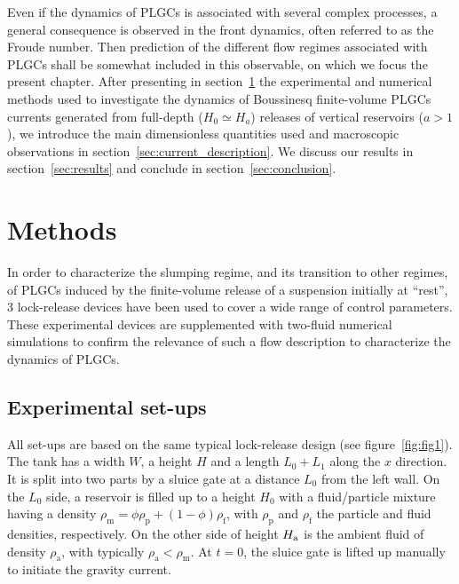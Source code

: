 \documentclass[12pt]{article}
\begin{document}
Even if the dynamics of PLGCs is associated with several complex processes, a general consequence is observed in the front dynamics, often referred to as the Froude number. Then prediction of the different flow regimes associated with PLGCs shall be somewhat included in this observable, on which we focus the present chapter. After presenting in section~\ref{sec:methods} the experimental and numerical methods used to investigate the dynamics of Boussinesq finite-volume PLGCs currents generated from full-depth ($H_{0} \simeq H_{a}$) releases of vertical reservoirs ($a >1$), we introduce the main dimensionless quantities used and macroscopic observations in section~\ref{sec:current_description}. We discuss our results in section~\ref{sec:results} and conclude in section~\ref{sec:conclusion}.

\section{Methods}
\label{sec:methods}

In order to characterize the slumping regime, and its transition to other regimes, of PLGCs induced by the finite-volume release of a suspension initially at ``rest'', 3 lock-release devices have been used to cover a wide range of control parameters. These experimental devices are supplemented with two-fluid numerical simulations to confirm the relevance of such a flow description to characterize the dynamics of PLGCs.

\subsection{Experimental set-ups}

All set-ups are based on the same typical lock-release design (see figure~\ref{fig:fig1}). The tank has a width $W$, a height $H$ and a length $L_0 + L_1$ along the $x$ direction. It is split into two parts by a sluice gate at a distance $L_0$ from the left wall. %
On the $L_0$ side, a reservoir is filled up to a height $H_0$ with a fluid/particle mixture having a density $\rho_{\text{m}} = \phi \rho_{\text{p}} + (1 - \phi)\rho_{\text{f}}$, with $\rho_{\text{p}}$ and $\rho_{\text{f}}$ the particle and fluid densities, respectively. On the other side of height $H_{\text a}$ is the ambient fluid of density $\rho_{\text{a}}$, with typically $\rho_{\text{a}} < \rho_{\text{m}}$. At $t = 0$, the sluice gate is lifted up manually to initiate the gravity current.
\end{document}
